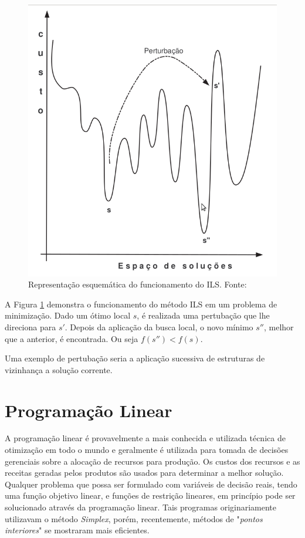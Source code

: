 \begin{figure}[ht]
	\caption{Representação esquemática do funcionamento do ILS. \mbox{Fonte:
	\cite{notasmarcone}}}
	\label{img:ilsfuncionamento}
	\includegraphics[scale=0.3]{./img/ilsfuncionamento.png}
\end{figure}

A Figura \ref{img:ilsfuncionamento} demonstra o funcionamento do método ILS em um problema de minimização. Dado um ótimo local $s$, é realizada uma pertubação que lhe direciona para $s{'}$. Depois da aplicação da busca local, o novo mínimo $s{''}$, melhor que a anterior, é encontrada. Ou seja $f(s{''}) < f(s)$.

Uma exemplo de pertubação seria a aplicação sucessiva de estruturas de vizinhança a solução corrente.

\section{Programação Linear}

A programação linear é provavelmente a mais conhecida e utilizada técnica de
otimização em todo o mundo e geralmente é utilizada para tomada de
decisões gerenciais sobre a alocação de recursos para produção. Os custos dos recursos e
as receitas geradas pelos produtos são usados para determinar a melhor solução.
Qualquer problema que possa ser formulado com variáveis de decisão reais, tendo
uma função objetivo linear, e funções de restrição lineares, em princípio pode
ser solucionado através da programação linear. Tais programas originariamente
utilizavam o método \textit{Simplex}, porém, recentemente, métodos de
"\textit{pontos interiores}" se mostraram mais eficientes.

